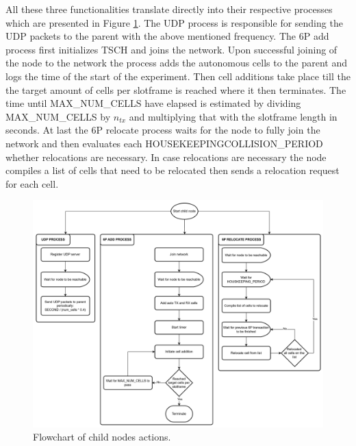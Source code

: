 \documentclass{comnets-thesis}
\begin{document}
All these three functionalities translate directly into their respective processes which are presented in Figure \ref{fig:child-node-flowchart}.
The UDP process is responsible for sending the UDP packets to the parent with the above mentioned frequency.
The \ac{6P} add process first initializes \ac{TSCH} and joins the network. Upon successful joining of the node to the network the process adds the autonomous cells to the parent and logs the time of the start of the experiment. Then cell additions take place till the the target amount of cells per slotframe is reached where it then terminates. The time until MAX\_NUM\_CELLS have elapsed is estimated by dividing MAX\_NUM\_CELLS by $n_{tx}$ and multiplying that with the slotframe length in seconds.
At last the \ac{6P} relocate process waits for the node to fully join the network and then evaluates each HOUSEKEEPINGCOLLISION\_PERIOD whether relocations are necessary. In case relocations are necessary the node compiles a list of cells that need to be relocated then sends a relocation request for each cell.

\begin{figure}[H]
    \centering
    \includegraphics[width=1\textwidth]{./images/child-node-flowchart.png}
    \caption{Flowchart of child nodes actions.}
    \label{fig:child-node-flowchart}
\end{figure}
\end{document}
